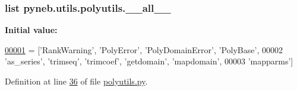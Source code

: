 \subsubsection[{\+\_\+\+\_\+all\+\_\+\+\_\+}]{\setlength{\rightskip}{0pt plus 5cm}list pyneb.\+utils.\+polyutils.\+\_\+\+\_\+all\+\_\+\+\_\+}\label{namespacepyneb_1_1utils_1_1polyutils_a5e54a45bb5c6fa4444f663a0b0da0e1f}
{\bfseries Initial value\+:}
\begin{DoxyCode}
\hypertarget{namespacepyneb_1_1utils_1_1polyutils_l00001}{}\hyperlink{namespacepyneb_1_1utils_1_1polyutils}{00001} = [\textcolor{stringliteral}{'RankWarning'}, \textcolor{stringliteral}{'PolyError'}, \textcolor{stringliteral}{'PolyDomainError'}, \textcolor{stringliteral}{'PolyBase'},
00002            \textcolor{stringliteral}{'as\_series'}, \textcolor{stringliteral}{'trimseq'}, \textcolor{stringliteral}{'trimcoef'}, \textcolor{stringliteral}{'getdomain'}, \textcolor{stringliteral}{'mapdomain'},
00003            \textcolor{stringliteral}{'mapparms'}]
\end{DoxyCode}


Definition at line \hyperlink{polyutils_8py_source_l00036}{36} of file \hyperlink{polyutils_8py_source}{polyutils.\+py}.

